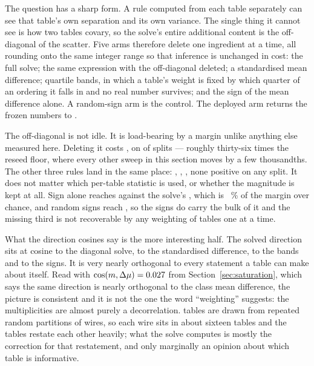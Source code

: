 \documentclass[11pt]{article}
\begin{document}
The question has a sharp form. A rule computed from each table separately can see
that table's own separation and its own variance. The single thing it cannot see
is how two tables covary, so the solve's entire additional content is the
off-diagonal of the scatter. Five arms therefore delete one ingredient at a time,
all rounding onto the same integer range so that inference is unchanged in cost:
the full solve; the same expression with the off-diagonal deleted; a standardised
mean difference; quartile bands, in which a table's weight is fixed by which
quarter of an ordering it falls in and no real number survives; and the sign of
the mean difference alone. A random-sign arm is the control. The deployed arm
returns the frozen numbers to \CombRepro{}.

The off-diagonal is not idle. It is load-bearing by a margin unlike anything else
measured here. Deleting it costs \CombDiag{}, on \CombDiagSplits{} of
\LadderSplits{} splits --- roughly thirty-six times the \SatReseed{} reseed floor,
where every other sweep in this section moves by a few thousandths. The other
three rules land in the same place: \CombStd{}, \CombBands{}, \CombSign{}, none
positive on any split. It does not matter which per-table statistic is used, or
whether the magnitude is kept at all. Sign alone reaches \CombSignAuc{} against
the solve's \CombDeployedAuc{}, which is \CombSignShare{}~\% of the margin over
chance, and random signs reach \CombRandSignAuc{}, so the signs do carry the bulk
of it and the missing third is not recoverable by any weighting of tables one at a
time.

What the direction cosines say is the more interesting half. The solved direction
sits at cosine \CombDiagCos{} to the diagonal solve, \CombStdCos{} to the
standardised difference, \CombBandsCos{} to the bands and \CombSignCos{} to the
signs. It is very nearly orthogonal to every statement a table can make about
itself. Read with \(\cos(m,\Delta\mu)=0.027{}\) from
Section~\ref{sec:saturation}, which says the same direction is nearly orthogonal
to the class mean difference, the picture is consistent and it is not the one the
word ``weighting'' suggests: the multiplicities are almost purely a decorrelation.
\CompTablesFull{} tables are drawn from repeated random partitions of
\NTabWires{} wires, so each wire sits in about sixteen tables and the tables restate
each other heavily; what the solve computes is mostly the correction for that
restatement, and only marginally an opinion about which table is informative.
\end{document}

